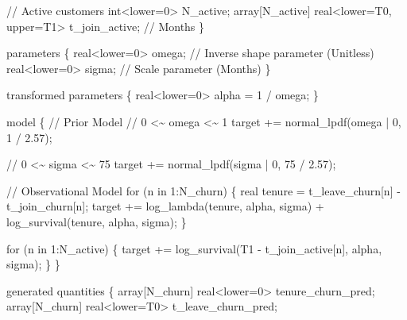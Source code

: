 \documentclass[
  letterpaper,
  DIV=11,
  numbers=noendperiod]{scrartcl}
\newenvironment{Shaded}{\begin{snugshade}}{\end{snugshade}}
\newcommand{\CommentTok}[1]{\textcolor[rgb]{0.37,0.37,0.37}{#1}}
\newcommand{\ControlFlowTok}[1]{\textcolor[rgb]{0.00,0.23,0.31}{#1}}
\newcommand{\DataTypeTok}[1]{\textcolor[rgb]{0.68,0.00,0.00}{#1}}
\newcommand{\DecValTok}[1]{\textcolor[rgb]{0.68,0.00,0.00}{#1}}
\newcommand{\FloatTok}[1]{\textcolor[rgb]{0.68,0.00,0.00}{#1}}
\newcommand{\KeywordTok}[1]{\textcolor[rgb]{0.00,0.23,0.31}{#1}}
\newcommand{\NormalTok}[1]{\textcolor[rgb]{0.00,0.23,0.31}{#1}}
\begin{document}
\begin{codelisting}
\begin{Shaded}
\begin{Highlighting}[]
  \CommentTok{// Active customers}
  \DataTypeTok{int}\NormalTok{\textless{}}\KeywordTok{lower}\NormalTok{=}\DecValTok{0}\NormalTok{\textgreater{} N\_active;}
  \DataTypeTok{array}\NormalTok{[N\_active] }\DataTypeTok{real}\NormalTok{\textless{}}\KeywordTok{lower}\NormalTok{=T0, }\KeywordTok{upper}\NormalTok{=T1\textgreater{} t\_join\_active; }\CommentTok{// Months}
\NormalTok{\}}

\KeywordTok{parameters}\NormalTok{ \{}
  \DataTypeTok{real}\NormalTok{\textless{}}\KeywordTok{lower}\NormalTok{=}\DecValTok{0}\NormalTok{\textgreater{} omega; }\CommentTok{// Inverse shape parameter (Unitless)}
  \DataTypeTok{real}\NormalTok{\textless{}}\KeywordTok{lower}\NormalTok{=}\DecValTok{0}\NormalTok{\textgreater{} sigma; }\CommentTok{// Scale parameter (Months)}
\NormalTok{\}}

\KeywordTok{transformed parameters}\NormalTok{ \{}
  \DataTypeTok{real}\NormalTok{\textless{}}\KeywordTok{lower}\NormalTok{=}\DecValTok{0}\NormalTok{\textgreater{} alpha = }\DecValTok{1}\NormalTok{ / omega;}
\NormalTok{\}}

\KeywordTok{model}\NormalTok{ \{}
  \CommentTok{// Prior Model}
  \CommentTok{// 0 \textless{}\textasciitilde{} omega \textless{}\textasciitilde{} 1}
  \KeywordTok{target +=}\NormalTok{ normal\_lpdf(omega | }\DecValTok{0}\NormalTok{, }\DecValTok{1}\NormalTok{ / }\FloatTok{2.57}\NormalTok{);}

  \CommentTok{// 0 \textless{}\textasciitilde{} sigma \textless{}\textasciitilde{} 75}
  \KeywordTok{target +=}\NormalTok{ normal\_lpdf(sigma | }\DecValTok{0}\NormalTok{, }\DecValTok{75}\NormalTok{ / }\FloatTok{2.57}\NormalTok{);}

  \CommentTok{// Observational Model}
  \ControlFlowTok{for}\NormalTok{ (n }\ControlFlowTok{in} \DecValTok{1}\NormalTok{:N\_churn) \{}
    \DataTypeTok{real}\NormalTok{ tenure = t\_leave\_churn[n] {-} t\_join\_churn[n];}
    \KeywordTok{target +=}\NormalTok{   log\_lambda(tenure, alpha, sigma)}
\NormalTok{              + log\_survival(tenure, alpha, sigma);}
\NormalTok{  \}}

  \ControlFlowTok{for}\NormalTok{ (n }\ControlFlowTok{in} \DecValTok{1}\NormalTok{:N\_active) \{}
    \KeywordTok{target +=}\NormalTok{ log\_survival(T1 {-} t\_join\_active[n], alpha, sigma);}
\NormalTok{  \}}
\NormalTok{\}}

\KeywordTok{generated quantities}\NormalTok{ \{}
  \DataTypeTok{array}\NormalTok{[N\_churn] }\DataTypeTok{real}\NormalTok{\textless{}}\KeywordTok{lower}\NormalTok{=}\DecValTok{0}\NormalTok{\textgreater{} tenure\_churn\_pred;}
  \DataTypeTok{array}\NormalTok{[N\_churn] }\DataTypeTok{real}\NormalTok{\textless{}}\KeywordTok{lower}\NormalTok{=T0\textgreater{} t\_leave\_churn\_pred;}


\end{Highlighting}
\end{Shaded}
\end{codelisting}
\end{document}
